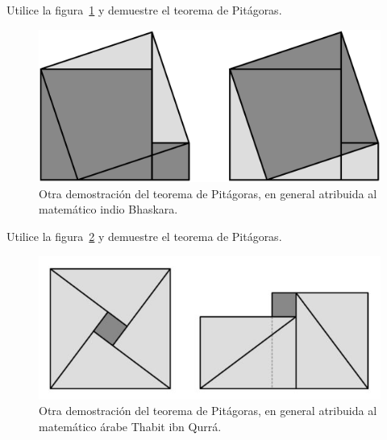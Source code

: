 \begin{exercise}
	Utilice la figura~\ref{fig:Bhaskara} y 
	demuestre el teorema de Pitágoras.
	\begin{figure}[h]
		\centering
		\includegraphics[scale=.2]{images/pitagoras_bhaskara}
		\caption{Otra demostración del teorema de Pitágoras, en general
		atribuida al matemático indio Bhaskara.}
		\label{fig:Bhaskara}
	\end{figure}
\end{exercise}


\begin{exercise}
	Utilice la figura~\ref{fig:arabe} y 
	demuestre el teorema de Pitágoras.
	\begin{figure}[h]
		\centering
		\includegraphics[scale=.5]{images/pitagoras_arabe}
		\caption{Otra demostración del teorema de Pitágoras, en general
		atribuida al matemático árabe Thabit ibn Qurrá.}
		\label{fig:arabe}
	\end{figure}
\end{exercise}


